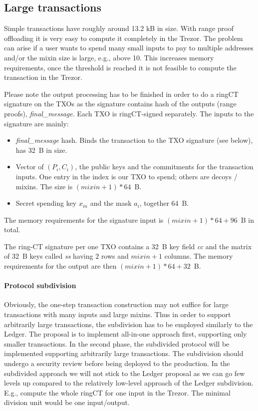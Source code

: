 \documentclass[]{article}
\begin{document}
\subsection{Large transactions}
Simple transactions have roughly around 13.2 kB in size. With range proof offloading it is very easy to compute it completely in the Trezor. The problem can arise if a user wants to spend many small inputs to pay to multiple addresses and/or the mixin size is large, e.g., above 10. This increases memory requirements, once the threshold is reached it is not feasible to compute the transaction in the Trezor.

Please note the output processing has to be finished in order to do a ringCT signature on the TXOs as the signature contains hash of the outputs (range proofs), \emph{final\_message}. Each TXO is ringCT-signed separately. The inputs to the signature are mainly:

\begin{itemize}
	\item \emph{final\_message} hash. Binds the transaction to the TXO signature (see below), has 32~B in size.
    \item Vector of $(P_i, C_i)$, the public keys and the commitments for the transaction inputs. One entry in the index is our TXO to spend; others are decoys / mixins. The size is $(mixin+1) * 64$~B.
	\item Secret spending key $x_{in}$ and the mask $a_i$, together 64~B.
\end{itemize}
The memory requirements for the signature input is $(mixin+1) * 64 + 96$~B in total.

The ring-CT signature per one TXO contains a 32~B key field \emph{cc} and the matrix of 32~B keys called \emph{ss} having $2$ rows and $mixin + 1$ columns. The memory requirements for the output are then $(mixin + 1) * 64 + 32$~B.

\paragraph{Protocol subdivision }

Obviously, the one-step transaction construction may not suffice for large transactions with many inputs and large mixins. Thus in order to support arbitrarily large transactions, the subdivision has to be employed similarly to the Ledger. The proposal is to implement all-in-one approach first, supporting only smaller transactions. In the second phase, the subdivided protocol will be implemented supporting arbitrarily large transactions. The subdivision should undergo a security review before being deployed to the production. In the subdivided approach we will not stick to the Ledger proposal as we can go few levels up compared to the relatively low-level approach of the Ledger subdivision. E.g., compute the whole ringCT for one input in the Trezor. The minimal division unit would be one input/output.
\end{document}
